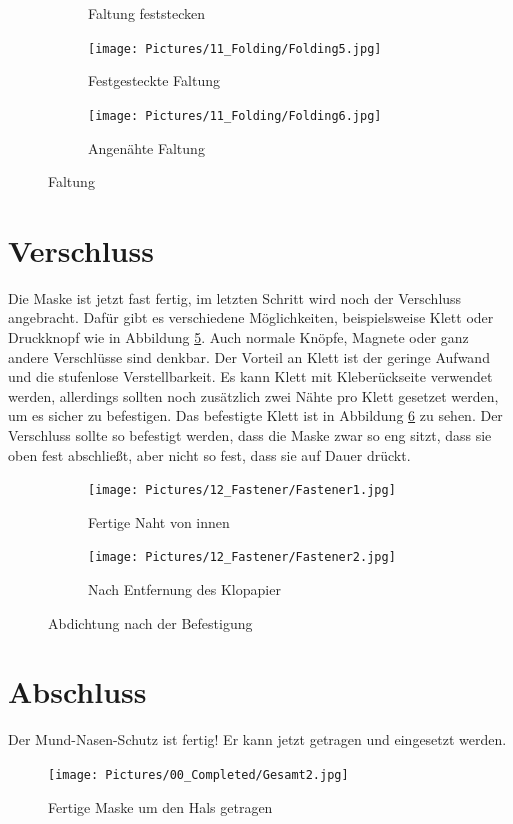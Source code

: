 \documentclass[12pt,parskip=full]{scrartcl}
\begin{document}
\begin{figure}[ht]
\begin{subfigure}{0.48\textwidth}
        \caption{Faltung feststecken}
        \label{Folding4}
    \end{subfigure}
    \begin{subfigure}{0.48\textwidth}
        \centering
        \texttt{[image: Pictures/11\_Folding/Folding5.jpg]}
        \caption{Festgesteckte Faltung}
        \label{Folding5}
    \end{subfigure}
    \begin{subfigure}{0.48\textwidth}
        \centering
        \texttt{[image: Pictures/11\_Folding/Folding6.jpg]}
        \caption{Angenähte Faltung}
        \label{Folding6}
    \end{subfigure}
    \caption{Faltung}
    \label{Folding}
\end{figure}

\section{Verschluss}
Die Maske ist jetzt fast fertig, im letzten Schritt wird noch der Verschluss angebracht. Dafür gibt es verschiedene Möglichkeiten, beispielsweise Klett oder Druckknopf wie in Abbildung \ref{Fastener1}. Auch normale Knöpfe, Magnete oder ganz andere Verschlüsse sind denkbar. Der Vorteil an Klett ist der geringe Aufwand und die stufenlose Verstellbarkeit. Es kann Klett mit Kleberückseite verwendet werden, allerdings sollten noch zusätzlich zwei Nähte pro Klett gesetzet werden, um es sicher zu befestigen. Das befestigte Klett ist in Abbildung \ref{Fastener2} zu sehen. Der Verschluss sollte so befestigt werden, dass die Maske zwar so eng sitzt, dass sie oben fest abschließt, aber nicht so fest, dass sie auf Dauer drückt.

\begin{figure}[ht]
    \vspace{0.5cm}
    \centering
    \begin{subfigure}{0.48\textwidth}
        \centering
        \texttt{[image: Pictures/12\_Fastener/Fastener1.jpg]}
        \caption{Fertige Naht von innen}
        \label{Fastener1}
    \end{subfigure}
    \begin{subfigure}{0.48\textwidth}
        \centering
        \texttt{[image: Pictures/12\_Fastener/Fastener2.jpg]}
        \caption{Nach Entfernung des Klopapier}
        \label{Fastener2}
    \end{subfigure}
    \caption{Abdichtung nach der Befestigung}
    \label{Fastener}
\end{figure}

\section{Abschluss}
Der Mund-Nasen-Schutz ist fertig! Er kann jetzt getragen und eingesetzt werden.

\begin{figure}
    \centering
    \texttt{[image: Pictures/00\_Completed/Gesamt2.jpg]}
    \caption{Fertige Maske um den Hals getragen}
    \label{Ready}
\end{figure}
\end{document}
